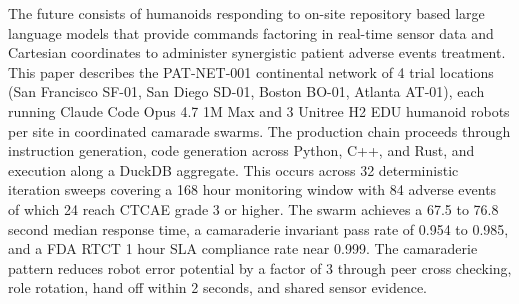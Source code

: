 %
%

\begin{sectionaccent}

The future consists of humanoids responding to on-site repository based large language models that provide commands factoring in real-time sensor data and Cartesian coordinates to administer synergistic patient adverse events treatment. This paper describes the PAT-NET-001 continental network of
4 trial locations (San Francisco SF-01, San Diego SD-01, Boston BO-01,
Atlanta AT-01), each running Claude Code Opus 4.7 1M Max and 3 Unitree H2 EDU humanoid robots per site in coordinated camarade swarms. The production chain
proceeds through instruction generation, code generation across Python, C++, and Rust, and execution along a DuckDB aggregate. This occurs across 32 deterministic iteration sweeps covering a
168 hour monitoring window with 84 adverse events of which 24 reach CTCAE grade 3 or higher. The swarm achieves a 67.5 to
76.8 second median response time, a camaraderie invariant pass rate
of 0.954 to 0.985, and a FDA RTCT 1 hour SLA compliance rate near
0.999. The camaraderie pattern reduces robot error potential
by a factor of 3 through peer cross checking, role rotation, hand off
within 2 seconds, and shared sensor evidence. 

\end{sectionaccent}
